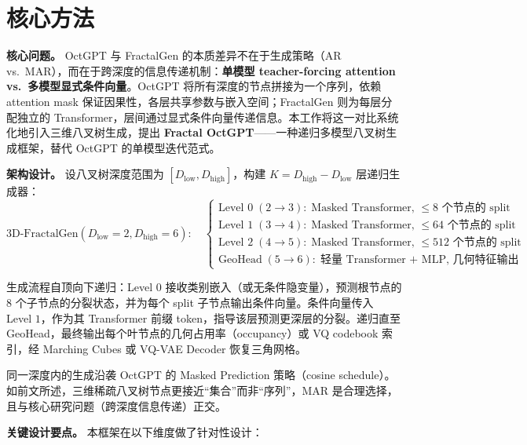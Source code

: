 \documentclass[12pt,a4paper]{article}
\begin{document}
\section{核心方法}

\textbf{核心问题。}
OctGPT 与 FractalGen 的本质差异不在于生成策略（AR vs.\ MAR），而在于跨深度的信息传递机制：\textbf{单模型 teacher-forcing attention vs.\ 多模型显式条件向量}。OctGPT 将所有深度的节点拼接为一个序列，依赖 attention mask 保证因果性，各层共享参数与嵌入空间；FractalGen 则为每层分配独立的 Transformer，层间通过显式条件向量传递信息。本工作将这一对比系统化地引入三维八叉树生成，提出 \textbf{Fractal OctGPT}——一种递归多模型八叉树生成框架，替代 OctGPT 的单模型迭代范式。

\textbf{架构设计。}
设八叉树深度范围为 $[D_{\text{low}}, D_{\text{high}}]$，构建 $K = D_{\text{high}} - D_{\text{low}}$ 层递归生成器：
\begin{equation}
\text{3D-FractalGen}(D_{\text{low}}=2, D_{\text{high}}=6):
\quad
\begin{cases}
\text{Level } 0\;(2\to 3):\; \text{Masked Transformer, } \leq 8 \text{ 个节点的 split}\\[4pt]
\text{Level } 1\;(3\to 4):\; \text{Masked Transformer, } \leq 64 \text{ 个节点的 split}\\[4pt]
\text{Level } 2\;(4\to 5):\; \text{Masked Transformer, } \leq 512 \text{ 个节点的 split}\\[4pt]
\text{GeoHead}\;(5\to6):\; \text{轻量 Transformer + MLP, 几何特征输出}
\end{cases}
\end{equation}

生成流程自顶向下递归：Level $0$ 接收类别嵌入（或无条件隐变量），预测根节点的 8 个子节点的分裂状态，并为每个 split 子节点输出条件向量。条件向量传入 Level $1$，作为其 Transformer 前缀 token，指导该层预测更深层的分裂。递归直至 GeoHead，最终输出每个叶节点的几何占用率（occupancy）或 VQ codebook 索引，经 Marching Cubes 或 VQ-VAE Decoder 恢复三角网格。

同一深度内的生成沿袭 OctGPT 的 Masked Prediction 策略（cosine schedule）。如前文所述，三维稀疏八叉树节点更接近“集合”而非“序列”，MAR 是合理选择，且与核心研究问题（跨深度信息传递）正交。

\textbf{关键设计要点。}
本框架在以下维度做了针对性设计：
\end{document}

